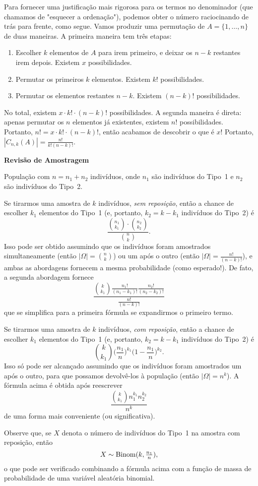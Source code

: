 Para fornecer uma justificação mais rigorosa para os termos no denominador (que chamamos de "esquecer a ordenação"), podemos obter o número raciocinando de trás para frente, como segue. Vamos produzir uma permutação de $A = \{1, \dots, n\}$ de duas maneiras. A primeira maneira tem três etapas:
\begin{enumerate}
\item
Escolher $k$ elementos de $A$ para irem primeiro, e deixar os $n-k$ restantes irem depois.
Existem $x$ possibilidades.
\item
Permutar os primeiros $k$ elementos.
Existem $k!$ possibilidades.
\item
Permutar os elementos restantes $n-k$.
Existem $(n-k)!$ possibilidades.
\end{enumerate}
No total, existem $x \cdot k! \cdot (n-k)!$ possibilidades.
A segunda maneira é direta: apenas permutar os $n$ elementos já existentes, existem $n!$ possibilidades.
Portanto, $n! = x \cdot k! \cdot (n-k)!$, então acabamos de descobrir o que é $x$!
Portanto, $ |C_{n,k}(A)| = \frac{n!}{k!(n-k)!}$.

\textbf{Revisão de Amostragem}

População com $n = n_1 + n_2$ indivíduos,
onde
$n_1$ são indivíduos do Tipo~1
e
$n_2$ são indivíduos do Tipo~2.

Se tirarmos uma amostra de $k$ indivíduos, \emph{sem reposição}, então a chance de escolher $k_1$ elementos do Tipo~1 (e, portanto, $k_2=k-k_1$ indivíduos do Tipo~2) é
$$
\frac{\binom{n_1}{k_1} \cdot \binom{n_2}{k_2}}{\binom{n}{k}}
.
$$
Isso pode ser obtido assumindo que os indivíduos foram amostrados simultaneamente (então $|\Omega|=\binom{n}{k}$) ou um após o outro (então $|\Omega|=\frac{n!}{(n-k)!}$), e ambas as abordagens fornecem a mesma probabilidade (como esperado!).
De fato, a segunda abordagem fornece
\[
\frac{\binom{k}{k_1}\frac{n_1!}{(n_1-k_1)!}\frac{n_2!}{(n_2-k_2)!}}{\frac{n!}{(n-k)!}}
\]
que se simplifica para a primeira fórmula se expandirmos o primeiro termo.

Se tirarmos uma amostra de $k$ indivíduos, \emph{com reposição}, então a chance de escolher $k_1$ elementos do Tipo~1 (e, portanto, $k_2=k-k_1$ indivíduos do Tipo~2) é
$$
\binom{k}{k_1}
\Big(\frac{n_1}{n}\Big)^{k_1}
\Big(1-\frac{n_1}{n}\Big)^{k_2}
.
$$
Isso só pode ser alcançado assumindo que os indivíduos foram amostrados um após o outro, para que possamos devolvê-los à população (então $|\Omega|=n^k$).
A fórmula acima é obtida após reescrever
$$ \frac{\binom{k}{k_1}n_1^{k_1}n_2^{k_2}}{n^k} $$ de uma forma mais conveniente (ou significativa).

Observe que, se $X$ denota o número de indivíduos do Tipo~1 na amostra com reposição, então
\[
X \sim \mathrm{Binom}(k,\tfrac{n_1}{n})
,
\]
o que pode ser verificado combinando a fórmula acima com a função de massa de probabilidade de uma variável aleatória binomial.
